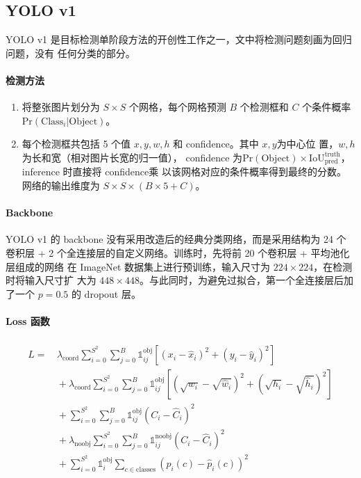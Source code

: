 \subsection{YOLO v1}
\label{subsec:YOLOv1}
YOLO v1 是目标检测单阶段方法的开创性工作之一，文中将检测问题刻画为回归问题，没有
任何分类的部分。

\paragraph{检测方法}

\begin{enumerate}
  \item 将整张图片划分为 $S \times S$ 个网格，每个网格预测 $ B $ 个检测框和 $ C $
    个条件概率 $ \mathrm{Pr}(\mathrm{Class}_i|\mathrm{Object}) $。
  \item 每个检测框共包括 5 个值 $x, y, w, h$ 和 confidence。其中 $x, y$为中心位
    置，$w, h$ 为长和宽（相对图片长宽的归一值），
    confidence 为$\mathrm{Pr}(\mathrm{Object}) \times
    \mathrm{IoU}^{\mathrm{truth}}_{\mathrm{pred}}$，inference 时直接将 confidence乘
    以该网格对应的条件概率得到最终的分数。网络的输出维度为 $ S \times S \times (B
    \times 5 + C) $。
\end{enumerate}

\paragraph{Backbone}

YOLO v1 的 backbone 没有采用改造后的经典分类网络，而是采用结构为 24 个卷积层 + 2
个全连接层的自定义网络。训练时，先将前 20 个卷积层 + 平均池化层组成的网络
在 ImageNet 数据集上进行预训练，输入尺寸为 $224 \times 224$，在检测时将输入尺寸扩
大为 $448 \times 448$。与此同时，为避免过拟合，第一个全连接层后加了一个 $p=0.5$
的 dropout 层。

\paragraph{Loss 函数}

\begin{align}
  \label{equ:yolo-v1-loss}
  \begin{split}
    L = & \, \lambda_{\mathrm{coord}} \sum_{i=0}^{S^2} \sum_{j=0}^{B} \mathds{1}_{ij}^{\mathrm{obj}} \left [ \left (x_i - \hat{x}_i \right )^2 + \left (y_i - \hat{y}_i \right )^2 \right ] \\
    & \, + \lambda_{\mathrm{coord}} \sum_{i=0}^{S^2} \sum_{j=0}^{B} \mathds{1}_{ij}^{\mathrm{obj}} \left [ \left(\sqrt{w_i} - \sqrt{\hat{w}_i} \right)^2 + \left (\sqrt{h_i} - \sqrt{\hat{h}_i} \right )^2 \right ]  \\
    & \, + \sum_{i=0}^{S^2} \sum_{j=0}^{B} \mathds{1}_{ij}^{\mathrm{obj}} \left( C_i - \hat{C}_i \right)^2  \\
    & \, + \lambda_{\mathrm{noobj}} \sum_{i=0}^{S^2} \sum_{j=0}^{B} \mathds{1}_{ij}^{\mathrm{noobj}} \left( C_i - \hat{C}_i \right)^2  \\
    & \, + \sum_{i=0}^{S^2} \mathds{1}_{i}^{\mathrm{obj}} \sum_{c \in \mathrm{classes}} \left( p_i(c) - \hat{p}_i(c) \right)^2
  \end{split}
\end{align}

